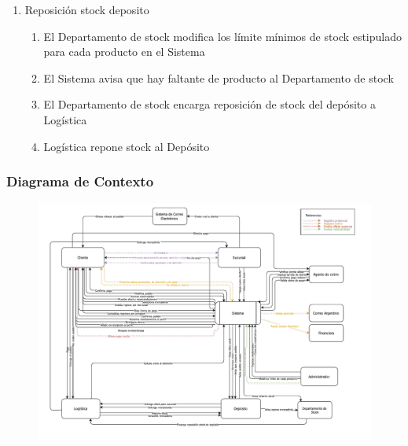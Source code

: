 \begin{enumerate}
\item Reposición stock deposito
  \begin{enumerate}
    \item El Departamento de stock modifica los límite mínimos de stock estipulado para cada producto en el Sistema \label{itm:f-deptostock-limite-stock-sistema}
    \item El Sistema avisa que hay faltante de producto al Departamento de stock \label{itm:f-sistema-falta-producto-deptostock}
    \item El Departamento de stock encarga reposición de stock del depósito a Logística \label{itm:f-deptostock-encarga-stock-logistica}
    \item Logística repone stock al Depósito \label{itm:f-logistica-repone-stock-deposito}
  \end{enumerate}

\end{enumerate}
\clearpage

\subsubsection{Diagrama de Contexto}

\begin{figure}[H]
  \begin{center}
  \includegraphics[height=0.65\textheight,angle=90]{tp1/images/contexto.pdf}
  \end{center}
\end{figure}

